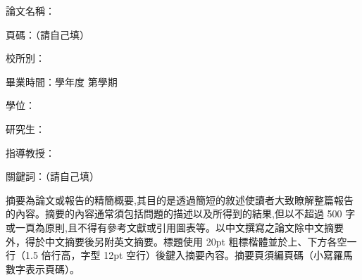 \begin{ZhAbstract}
    \begin{ZhAbstractItems}
        \noindent \text 論文名稱：\cTitle

        \noindent \text 頁碼：（請自己填）

        \noindent \text 校所別：\univCname \space \deptCname

        \noindent \text 畢業時間：\cYear 學年度 \space 第\cGraduateSemester 學期

        \noindent \text 學位：\degreeCname

        \noindent \text 研究生：\myCname

        \noindent \text 指導教授：\advisorCname

        \noindent \text 關鍵詞：（請自己填）

    \end{ZhAbstractItems}

    \begin{ZhAbstractDescription}
        摘要為論文或報告的精簡概要,其目的是透過簡短的敘述使讀者大致瞭解整篇報告的內容。摘要的內容通常須包括問題的描述以及所得到的結果,但以不超過 500 字或一頁為原則,且不得有參考文獻或引用圖表等。以中文撰寫之論文除中文摘要外，得於中文摘要後另附英文摘要。標題使用 20pt 粗標楷體並於上、下方各空一行（1.5 倍行高，字型 12pt 空行）後鍵入摘要內容。摘要頁須編頁碼（小寫羅馬數字表示頁碼）。
    \end{ZhAbstractDescription}
    
\end{ZhAbstract}

